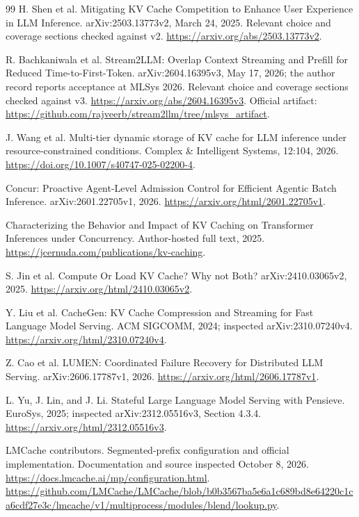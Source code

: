 \documentclass[10pt,a4paper]{article}
\begin{document}
\begin{thebibliography}{99}
H. Shen et al.
\newblock Mitigating KV Cache Competition to Enhance User Experience in LLM Inference.
\newblock arXiv:2503.13773v2, March 24, 2025. Relevant choice and coverage sections checked against v2. \url{https://arxiv.org/abs/2503.13773v2}.

R. Bachkaniwala et al.
\newblock Stream2LLM: Overlap Context Streaming and Prefill for Reduced Time-to-First-Token.
\newblock arXiv:2604.16395v3, May 17, 2026; the author record reports acceptance
at MLSys 2026. Relevant choice and coverage sections checked against v3.
\url{https://arxiv.org/abs/2604.16395v3}.
Official artifact: \url{https://github.com/rajveerb/stream2llm/tree/mlsys_artifact}.

J. Wang et al.
\newblock Multi-tier dynamic storage of KV cache for LLM inference under resource-constrained conditions.
\newblock Complex \& Intelligent Systems, 12:104, 2026.
\url{https://doi.org/10.1007/s40747-025-02200-4}.

\newblock Concur: Proactive Agent-Level Admission Control for Efficient Agentic Batch Inference.
\newblock arXiv:2601.22705v1, 2026.
\url{https://arxiv.org/html/2601.22705v1}.

\newblock Characterizing the Behavior and Impact of KV Caching on Transformer
Inferences under Concurrency.
\newblock Author-hosted full text, 2025.
\url{https://jcernuda.com/publications/kv-caching}.

S. Jin et al.
\newblock Compute Or Load KV Cache? Why not Both?
\newblock arXiv:2410.03065v2, 2025.
\url{https://arxiv.org/html/2410.03065v2}.

Y. Liu et al.
\newblock CacheGen: KV Cache Compression and Streaming for Fast Language Model Serving.
\newblock ACM SIGCOMM, 2024; inspected arXiv:2310.07240v4.
\url{https://arxiv.org/html/2310.07240v4}.

Z. Cao et al.
\newblock LUMEN: Coordinated Failure Recovery for Distributed LLM Serving.
\newblock arXiv:2606.17787v1, 2026.
\url{https://arxiv.org/html/2606.17787v1}.

L. Yu, J. Lin, and J. Li.
\newblock Stateful Large Language Model Serving with Pensieve.
\newblock EuroSys, 2025; inspected arXiv:2312.05516v3, Section 4.3.4.
\url{https://arxiv.org/html/2312.05516v3}.

LMCache contributors.
\newblock Segmented-prefix configuration and official implementation.
\newblock Documentation and source inspected October 8, 2026.
\url{https://docs.lmcache.ai/mp/configuration.html}.
\url{https://github.com/LMCache/LMCache/blob/b0b3567ba5e6a1c689bd8e64220c1ca6cdf27e3c/lmcache/v1/multiprocess/modules/blend/lookup.py}.


\end{thebibliography}
\end{document}
